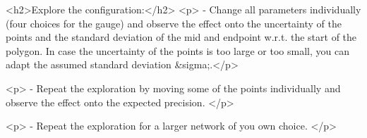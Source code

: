     <h2>Explore the configuration:</h2>
   <p> - Change all parameters individually (four choices for the gauge) and observe the effect onto the uncertainty of the points and the standard deviation of the mid and endpoint w.r.t. the start of the polygon. In case the uncertainty of the points is too large or too small, you can adapt the assumed standard deviation &sigma;.</p>
	
	  <p> - Repeat the exploration by moving some of the points individually and observe the effect onto the expected precision. </p>
		
 		<p> - Repeat the exploration for a larger network of you own choice. </p>
